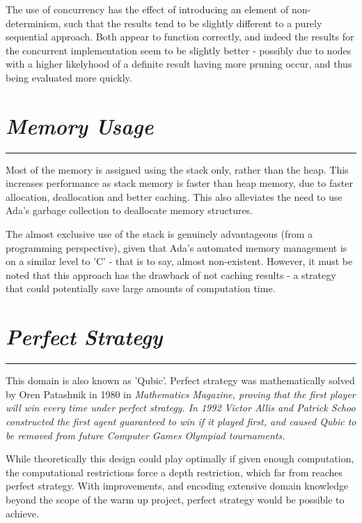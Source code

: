 \documentclass[10pt]{report}
\begin{document}
\begin{multicols}{2}
The use of concurrency has the effect of introducing an element of non-determinism, such that the results tend to be slightly different to a purely sequential approach. Both appear to function correctly, and indeed the results for the concurrent implementation seem to be slightly better - possibly due to nodes with a higher likelyhood of a definite result having more pruning occur, and thus being evaluated more quickly.

\section*{\emph{\textmd{Memory Usage}}}
\hrule
\vspace{0.4cm}

Most of the memory is assigned using the stack only, rather than the heap. This increases performance as stack memory is faster than heap memory, due to faster allocation, deallocation and better caching. This also alleviates the need to use Ada's garbage collection to deallocate memory structures. 

The almost exclusive use of the stack is genuinely advantageous (from a programming perspective), given that Ada's automated memory management is on a similar level to 'C' - that is to say, almost non-existent. However, it must be noted that this approach has the drawback of not caching results - a strategy that could potentially save large amounts of computation time.

\section*{\emph{{Perfect Strategy}}}
\hrule
\vspace{0.4cm}

This domain is also known as 'Qubic'. Perfect strategy was mathematically solved by Oren Patashnik in 1980 in \em Mathematics Magazine\em, proving that the first player will win every time under perfect strategy. In 1992 Victor Allis and Patrick Schoo constructed the first agent guaranteed to win if it played first, and caused Qubic to be removed from future Computer Games Olympiad tournaments.

While theoretically this design could play optimally if given enough computation, the computational restrictions force a depth restriction, which  far from reaches perfect strategy. With improvements, and encoding extensive domain knowledge beyond the scope of the warm up project, perfect strategy would be possible to achieve.


\end{multicols}
\end{document}
